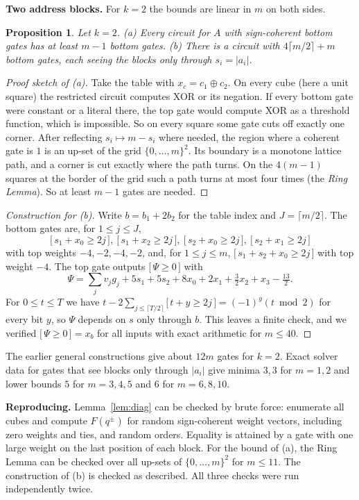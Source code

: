 \documentclass[11pt,letterpaper]{article}
\newtheorem{proposition}[theorem]{Proposition}
\theoremstyle{remark}
\newcommand{\ind}[1]{\bigl[\,#1\,\bigr]}
\newcommand{\smalltitle}[1]{\textbf{\color{ink}#1}\quad}
\begin{document}
\smalltitle{Two address blocks.}
For $k=2$ the bounds are linear in $m$ on both sides.

\begin{proposition}\label{prop:k2}
Let $k=2$. (a) Every circuit for $A$ with sign-coherent bottom gates has at
least $m-1$ bottom gates. (b) There is a circuit with $4\lceil m/2\rceil+m$
bottom gates, each seeing the blocks only through $s_i=|a_i|$.
\end{proposition}
\begin{proof}[Proof sketch of (a)]
Take the table with $x_c=c_1\oplus c_2$. On every cube (here a unit square)
the restricted circuit computes XOR or its negation. If every bottom gate were
constant or a literal there, the top gate would compute XOR as a threshold
function, which is impossible. So on every square some gate cuts off exactly
one corner. After reflecting $s_i\mapsto m-s_i$ where needed, the region where
a coherent gate is $1$ is an up-set of the grid $\{0,\dots,m\}^2$. Its
boundary is a monotone lattice path, and a corner is cut exactly where the
path turns. On the $4(m-1)$ squares at the border of the grid such a path
turns at most four times (the \emph{Ring Lemma}). So at least $m-1$ gates are needed.
\end{proof}
\begin{proof}[Construction for (b)]
Write $b=b_1+2b_2$ for the table index and $J=\lceil m/2\rceil$. The bottom
gates are, for $1\le j\le J$,
\[
\ind{s_1+x_0\ge2j},\ \ind{s_1+x_2\ge2j},\ \ind{s_2+x_0\ge2j},\ \ind{s_2+x_1\ge2j}
\]
with top weights $-4,-2,-4,-2$, and, for $1\le j\le m$, $\ind{s_1+s_2+x_0\ge2j}$
with top weight $-4$. The top gate outputs $\ind{\Psi\ge0}$ with
\[
\Psi=\sum_j v_jg_j+5s_1+5s_2+8x_0+2x_1+\tfrac32x_2+x_3-\tfrac{13}2 .
\]
For $0\le t\le T$ we have $t-2\sum_{j\le\lceil T/2\rceil}\ind{t+y\ge2j}=(-1)^y(t\bmod2)$
for every bit $y$, so $\Psi$ depends on $s$ only through $b$. This leaves a
finite check, and we verified $\ind{\Psi\ge0}=x_b$ for all inputs with exact
arithmetic for $m\le40$.
\end{proof}

The earlier general constructions give about $12m$ gates for $k=2$. Exact
solver data for gates that see blocks only through $|a_i|$ give minima $3,3$
for $m=1,2$ and lower bounds $5$ for $m=3,4,5$ and $6$ for $m=6,8,10$.

\smalltitle{Reproducing.}
Lemma~\ref{lem:diag} can be checked by brute force: enumerate all cubes and
compute $F(q^\pm)$ for random sign-coherent weight vectors, including zero
weights and ties, and random orders. Equality is attained by a gate with one
large weight on the last position of each block. For the bound of (a), the
Ring Lemma can be checked over all up-sets of $\{0,\dots,m\}^2$ for
$m\le11$. The construction of (b) is checked as described. All three checks
were run independently twice.
\end{document}

